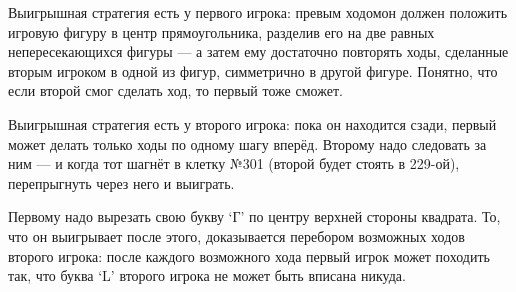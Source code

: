 \begin{itemize}
\itA Выигрышная стратегия есть у первого игрока: превым ходомон должен положить игровую фигуру в центр прямоугольника, разделив его на две равных непересекающихся фигуры — а затем ему достаточно повторять ходы, сделанные вторым игроком в одной из фигур, симметрично в другой фигуре. Понятно, что если второй смог сделать ход, то первый тоже сможет.

\itB Выигрышная стратегия есть у второго игрока: пока он находится сзади, первый может делать только ходы по одному шагу вперёд. Второму надо следовать за ним — и когда тот шагнёт в клетку №301 (второй будет стоять в 229-ой), перепрыгнуть через него и выиграть.

\itC Первому надо вырезать свою букву `Г' по центру верхней стороны квадрата. То, что он выигрывает после этого, доказывается перебором возможных ходов второго игрока: после каждого возможного хода первый игрок может походить так, что буква `L' второго игрока не может быть вписана никуда.
\end{itemize}